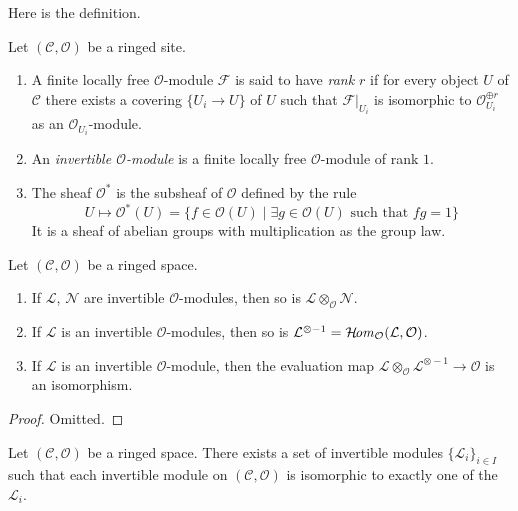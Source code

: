 \noindent
Here is the definition.

\begin{definition}
\label{definition-invertible-sheaf}
Let $(\mathcal{C}, \mathcal{O})$ be a ringed site.
\begin{enumerate}
\item A finite locally free $\mathcal{O}$-module $\mathcal{F}$ is said
to have {\it rank $r$} if for every object $U$ of $\mathcal{C}$ there
exists a covering $\{U_i \to U\}$ of $U$ such that $\mathcal{F}|_{U_i}$
is isomorphic to $\mathcal{O}_{U_i}^{\oplus r}$ as an
$\mathcal{O}_{U_i}$-module.
\item An {\it invertible $\mathcal{O}$-module} is a finite locally
free $\mathcal{O}$-module of rank $1$.
\item The sheaf {\it $\mathcal{O}^*$} is the subsheaf of
$\mathcal{O}$ defined by the rule
$$
U \longmapsto \mathcal{O}^*(U) = \{f \in \mathcal{O}(U) \mid
\exists g \in \mathcal{O}(U)\text{ such that }fg = 1\}
$$
It is a sheaf of abelian groups with multiplication as the group law.
\end{enumerate}
\end{definition}

\begin{lemma}
\label{lemma-constructions-invertible}
Let $(\mathcal{C}, \mathcal{O})$ be a ringed space.
\begin{enumerate}
\item If $\mathcal{L}$, $\mathcal{N}$ are invertible
$\mathcal{O}$-modules, then so is
$\mathcal{L} \otimes_\mathcal{O} \mathcal{N}$.
\item If $\mathcal{L}$ is an invertible
$\mathcal{O}$-modules, then so is
$\mathcal{L}^{\otimes -1}
= \mathop{\mathcal{H}\!{\it om}}\nolimits_\mathcal{O}(\mathcal{L}, \mathcal{O})$.
\item If $\mathcal{L}$ is an invertible
$\mathcal{O}$-module, then the evaluation map
$\mathcal{L} \otimes_\mathcal{O} \mathcal{L}^{\otimes -1}
\to \mathcal{O}$ is an isomorphism.
\end{enumerate}
\end{lemma}

\begin{proof}
Omitted.
\end{proof}

\begin{lemma}
\label{lemma-pic-set}
Let $(\mathcal{C}, \mathcal{O})$ be a ringed space.
There exists a set of invertible modules $\{\mathcal{L}_i\}_{i \in I}$
such that each invertible module on $(\mathcal{C}, \mathcal{O})$
is isomorphic to exactly one of the $\mathcal{L}_i$.
\end{lemma}

